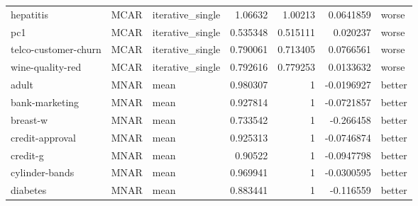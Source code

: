 \begin{table}[ht]
\begin{tabular}{lllrrrl}
 hepatitis            & MCAR        & iterative\_single &                                 1.06632  &                             1.00213  &                     0.0641859  & worse                \\
 pc1                  & MCAR        & iterative\_single &                                 0.535348 &                             0.515111 &                     0.020237   & worse                \\
 telco-customer-churn & MCAR        & iterative\_single &                                 0.790061 &                             0.713405 &                     0.0766561  & worse                \\
 wine-quality-red     & MCAR        & iterative\_single &                                 0.792616 &                             0.779253 &                     0.0133632  & worse                \\
 adult                & MNAR        & mean             &                                 0.980307 &                             1        &                    -0.0196927  & better               \\
 bank-marketing       & MNAR        & mean             &                                 0.927814 &                             1        &                    -0.0721857  & better               \\
 breast-w             & MNAR        & mean             &                                 0.733542 &                             1        &                    -0.266458   & better               \\
 credit-approval      & MNAR        & mean             &                                 0.925313 &                             1        &                    -0.0746874  & better               \\
 credit-g             & MNAR        & mean             &                                 0.90522  &                             1        &                    -0.0947798  & better               \\
 cylinder-bands       & MNAR        & mean             &                                 0.969941 &                             1        &                    -0.0300595  & better               \\
 diabetes             & MNAR        & mean             &                                 0.883441 &                             1        &                    -0.116559   & better               \\

\end{tabular}
\end{table}
